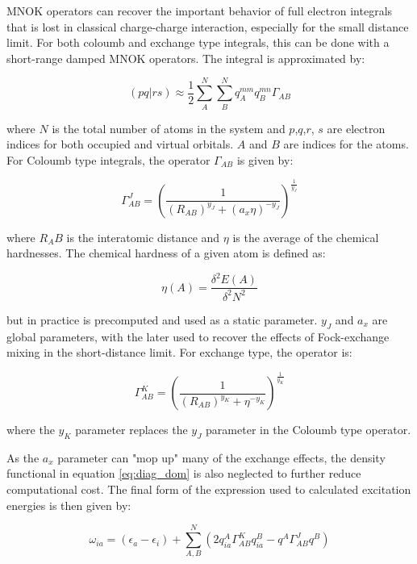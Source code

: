 MNOK operators can recover the important behavior of full electron integrals that
is lost in classical charge-charge interaction, especially for the small distance limit.
For both coloumb and exchange type integrals, this can be done with a short-range
damped MNOK operators. The integral is approximated by:

\begin{equation}
\left(pq|rs\right) \approx \frac{1}{2}\sum^N_A \sum^N_B q_A^{mm} q_B^{mn} \Gamma_{AB}
\end{equation}

where $N$ is the total number of atoms in the system and $p$,$q$,$r$, $s$ are electron
indices for both occupied and virtual orbitals. $A$ and $B$ are indices for the atoms.
For Coloumb type integrals, the operator $\Gamma_{AB}$ is given by:

\begin{equation}
\Gamma^J_{AB} = \left(\frac{1}{\left(R_{AB}\right)^{y_J} + \left(a_x \eta\right)^{-y_J}} \right)^{\frac{1}{y_J}}
\end{equation}

where $R_AB$ is the interatomic distance and $\eta$ is the average of the chemical 
hardnesses. The chemical hardness of a given atom is defined as:

\begin{equation}
\eta\left(A\right) = \frac{\delta^2 E\left(A\right)}{\delta^2 N^2}
\end{equation}

but in practice is precomputed and used as a static parameter. $y_J$ and $a_x$ are
global parameters, with the later used to recover the effects of Fock-exchange mixing
in the short-distance limit. For exchange type, the operator is:

\begin{equation}
\Gamma^K_{AB} = \left(\frac{1}{\left(R_{AB}\right)^{y_K} + \eta^{-y_K}} \right)^{\frac{1}{y_K}}
\end{equation}

where the $y_K$ parameter replaces the $y_J$ parameter in the Coloumb type operator.

As the $a_x$ parameter can "mop up" many of the exchange effects, the density functional
in equation \ref{eq:diag_dom} is also neglected to further reduce computational cost.
The final form of the expression used to calculated excitation energies is then 
given by:

\begin{equation}
\omega_{ia} = \left(\epsilon_a - \epsilon_i\right) + \sum^N_{A,B}\left(2 q_{ia}^A \Gamma^K_{AB} q_{ia}^B - q^A \Gamma^J_{AB} q^B\right)
\end{equation}

